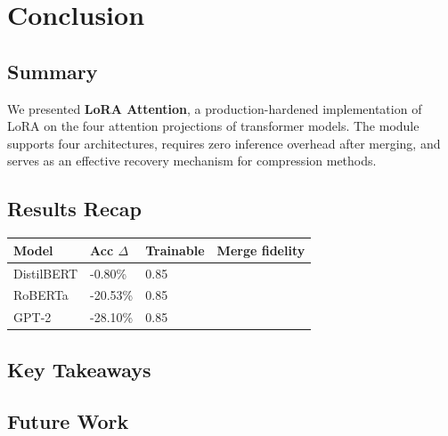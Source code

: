 \section{Conclusion}

\subsection{Summary}

We presented \textbf{LoRA Attention}, a production-hardened implementation of 
LoRA on the four attention projections of transformer models. The module 
supports four architectures, requires zero inference overhead after merging, 
and serves as an effective recovery mechanism for compression methods.

\subsection{Results Recap}

\begin{table}[H]
\centering
\small
\begin{tabular}{llll}
\toprule
\textbf{Model} & \textbf{Acc $\Delta$} & \textbf{Trainable} & \textbf{Merge fidelity} \\
\midrule
DistilBERT & -0.80\% & 0.85 &  \\
RoBERTa & -20.53\% & 0.85 &  \\
GPT-2 & -28.10\% & 0.85 &  \\
\bottomrule
\end{tabular}
\end{table}

\subsection{Key Takeaways}

\subsection{Future Work}

